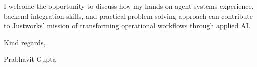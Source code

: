 \documentclass[11pt,a4paper]{article}
\begin{document}
\vspace{6pt}

\noindent I welcome the opportunity to discuss how my hands-on agent systems experience, backend integration skills, and practical problem-solving approach can contribute to Justworks' mission of transforming operational workflows through applied AI.

\vspace{8pt}

\noindent Kind regards,

\vspace{6pt}

\noindent Prabhavit Gupta
\end{document}
